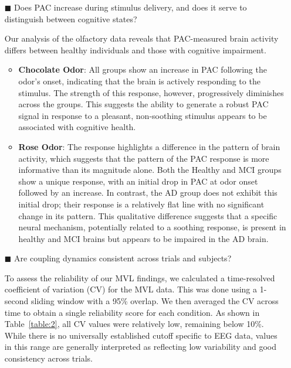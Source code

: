 \documentclass[hidelinks,12pt]{article}
\begin{document}
	
	\begin{itemize}
		\item[$\blacksquare$] Does PAC increase during stimulus delivery, and does it serve to distinguish between cognitive states?
		
		Our analysis of the olfactory data reveals that PAC-measured brain activity differs between healthy individuals and those with cognitive impairment.
		
		\begin{itemize}
			\item \textbf{Chocolate Odor}: All groups show an increase in PAC following the odor's onset, indicating that the brain is actively responding to the stimulus. The strength of this response, however, progressively diminishes across the groups. This suggests the ability to generate a robust PAC signal in response to a pleasant, non-soothing stimulus appears to be associated with cognitive health.
			
			\item \textbf{Rose Odor}: The response highlights a difference in the pattern of brain activity, which suggests that the pattern of the PAC response is more informative than its magnitude alone. Both the Healthy and MCI groups show a unique response, with an initial drop in PAC at odor onset followed by an increase. In contrast, the AD group does not exhibit this initial drop; their response is a relatively flat line with no significant change in its pattern. This qualitative difference suggests that a specific neural mechanism, potentially related to a soothing response, is present in healthy and MCI brains but appears to be impaired in the AD brain.
		\end{itemize}
		

		
		
		
		\item[$\blacksquare$] Are coupling dynamics consistent across trials and subjects?
		
		To assess the reliability of our MVL findings, we calculated a time-resolved coefficient of variation (CV) for the MVL data. This was done using a 1-second sliding window with a 95\% overlap. We then averaged the CV across time to obtain a single reliability score for each condition. As shown in Table~\ref{table:2}, all CV values were relatively low, remaining below 10\%. While there is no universally established cutoff specific to EEG data, values in this range are generally interpreted as reflecting low variability and good consistency across trials.
		
		
		

		
	\end{itemize}
	
\end{document}
